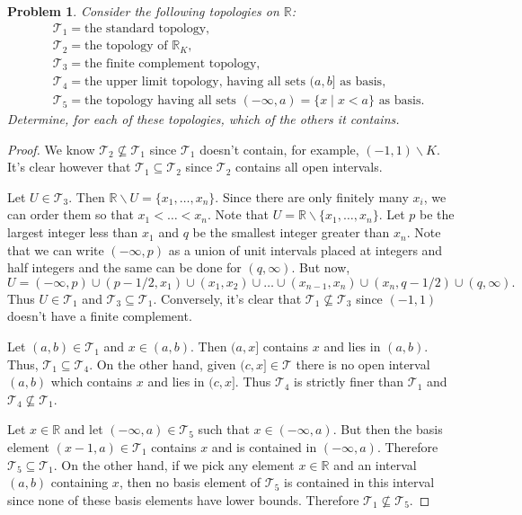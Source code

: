 \documentclass{article}
\newtheorem{problem}{Problem}
\begin{document}
\begin{problem}
Consider the following topologies on $\mathbb{R}$:
\begin{align*}
&\mathcal{T}_1 = \text{the standard topology},\\
&\mathcal{T}_2 = \text{the topology of $\mathbb{R}_K$},\\
&\mathcal{T}_3 = \text{the finite complement topology},\\
&\mathcal{T}_4 = \text{the upper limit topology, having all sets $(a,b]$ as basis},\\
&\mathcal{T}_5 = \text{the topology having all sets $(-\infty, a) = \{x \mid x < a\}$ as basis}.
\end{align*}
Determine, for each of these topologies, which of the others it contains.
\end{problem}
\begin{proof}
We know $\mathcal{T}_2 \nsubseteq \mathcal{T}_1$ since $\mathcal{T}_1$ doesn't contain, for example, $(-1, 1) \backslash K$. It's clear however that $\mathcal{T}_1 \subseteq \mathcal{T}_2$ since $\mathcal{T}_2$ contains all open intervals.

Let $U \in \mathcal{T}_3$. Then $\mathbb{R} \backslash U = \{x_1, \dots , x_n\}$. Since there are only finitely many $x_i$, we can order them so that $x_1 < \dots < x_n$. Note that $U = \mathbb{R} \backslash \{x_1, \dots , x_n\}$. Let $p$ be the largest integer less than $x_1$ and $q$ be the smallest integer greater than $x_n$. Note that we can write $(-\infty, p)$ as a union of unit intervals placed at integers and half integers and the same can be done for $(q, \infty)$. But now,
\[
U = (-\infty, p) \cup (p-1/2, x_1) \cup (x_1, x_2) \cup \dots \cup (x_{n-1}, x_n) \cup (x_n, q-1/2) \cup (q, \infty).
\]
Thus $U \in \mathcal{T}_1$ and $\mathcal{T}_3 \subseteq \mathcal{T}_1$. Conversely, it's clear that $\mathcal{T}_1 \nsubseteq \mathcal{T}_3$ since $(-1,1)$ doesn't have a finite complement.

Let $(a,b) \in \mathcal{T}_1$ and $x \in (a,b)$. Then $(a,x]$ contains $x$ and lies in $(a,b)$. Thus, $\mathcal{T}_1 \subseteq \mathcal{T}_4$. On the other hand, given $(c,x] \in \mathcal{T}$ there is no open interval $(a,b)$ which contains $x$ and lies in $(c,x]$. Thus $\mathcal{T}_4$ is strictly finer than $\mathcal{T}_1$ and $\mathcal{T}_4 \nsubseteq \mathcal{T}_1$.

Let $x \in \mathbb{R}$ and let $(-\infty, a) \in \mathcal{T}_5$ such that $x \in (-\infty, a)$. But then the basis element $(x-1,a) \in \mathcal{T}_1$ contains $x$ and is contained in $(-\infty, a)$. Therefore $\mathcal{T}_5 \subseteq \mathcal{T}_1$. On the other hand, if we pick any element $x \in \mathbb{R}$ and an interval $(a,b)$ containing $x$, then no basis element of $\mathcal{T}_5$ is contained in this interval since none of these basis elements have lower bounds. Therefore $\mathcal{T}_1 \nsubseteq \mathcal{T}_5$.


\end{proof}
\end{document}
